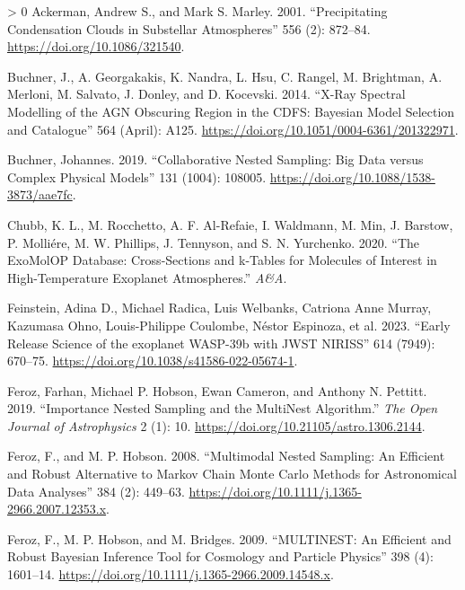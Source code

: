 \documentclass[10pt,a4paper,onecolumn]{article}
\newlength{\cslhangindent}
\newenvironment{CSLReferences}[3] %
 {%
  \setlength{\parindent}{0pt}
  \ifodd #1 \everypar{\setlength{\hangindent}{\cslhangindent}}\ignorespaces\fi
  \ifnum #2 > 0
  \setlength{\parskip}{#2\baselineskip}
  \fi
 }%
 {}
\begin{document}
\hypertarget{refs}{}
\begin{CSLReferences}{1}{0}
{\hypertarget{ref-ackerman2001}{}}%
Ackerman, Andrew S., and Mark S. Marley. 2001. {``{Precipitating
Condensation Clouds in Substellar Atmospheres}''} 556 (2): 872--84.
\url{https://doi.org/10.1086/321540}.

\hypertarget{ref-buchner2014}{}%
Buchner, J., A. Georgakakis, K. Nandra, L. Hsu, C. Rangel, M. Brightman,
A. Merloni, M. Salvato, J. Donley, and D. Kocevski. 2014. {``X-Ray
Spectral Modelling of the {AGN} Obscuring Region in the {CDFS}:
{Bayesian} Model Selection and Catalogue''} 564 (April): A125.
\url{https://doi.org/10.1051/0004-6361/201322971}.

\hypertarget{ref-buchner2019}{}%
Buchner, Johannes. 2019. {``{Collaborative Nested Sampling: Big Data
versus Complex Physical Models}''} 131 (1004): 108005.
\url{https://doi.org/10.1088/1538-3873/aae7fc}.

\hypertarget{ref-chubb2020}{}%
Chubb, K. L., M. Rocchetto, A. F. Al-Refaie, I. Waldmann, M. Min, J.
Barstow, P. Molliére, M. W. Phillips, J. Tennyson, and S. N. Yurchenko.
2020. {``The {ExoMolOP} {Database}: {Cross}-Sections and k-Tables for
{Molecules} of {Interest} in {High}-{Temperature} {Exoplanet}
{Atmospheres}.''} \emph{A\&A}.

\hypertarget{ref-feinstein_niriss_2023}{}%
Feinstein, Adina D., Michael Radica, Luis Welbanks, Catriona Anne
Murray, Kazumasa Ohno, Louis-Philippe Coulombe, Néstor Espinoza, et al.
2023. {``{Early Release Science of the exoplanet WASP-39b with JWST
NIRISS}''} 614 (7949): 670--75.
\url{https://doi.org/10.1038/s41586-022-05674-1}.

\hypertarget{ref-feroz2013}{}%
Feroz, Farhan, Michael P. Hobson, Ewan Cameron, and Anthony N. Pettitt.
2019. {``{Importance Nested Sampling and the MultiNest Algorithm}.''}
\emph{The Open Journal of Astrophysics} 2 (1): 10.
\url{https://doi.org/10.21105/astro.1306.2144}.

\hypertarget{ref-feroz2008}{}%
Feroz, F., and M. P. Hobson. 2008. {``Multimodal Nested Sampling: An
Efficient and Robust Alternative to {Markov} {Chain} {Monte} {Carlo}
Methods for Astronomical Data Analyses''} 384 (2): 449--63.
\url{https://doi.org/10.1111/j.1365-2966.2007.12353.x}.

\hypertarget{ref-feroz2009}{}%
Feroz, F., M. P. Hobson, and M. Bridges. 2009. {``{MULTINEST}: An
Efficient and Robust {Bayesian} Inference Tool for Cosmology and
Particle Physics''} 398 (4): 1601--14.
\url{https://doi.org/10.1111/j.1365-2966.2009.14548.x}.


\end{CSLReferences}
\end{document}
